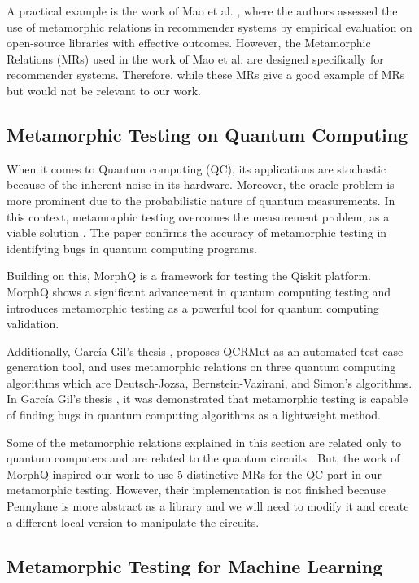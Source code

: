 \documentclass[12pt,a4paper]{article}
\begin{document}
	A practical example is the work of Mao et al. \cite{cmao2024}, where the authors assessed the use of metamorphic relations in recommender systems by empirical evaluation on open-source libraries with effective outcomes. However, the Metamorphic Relations (MRs) used in the work of Mao et al. \cite{cmao2024} are designed specifically for recommender systems. Therefore, while these MRs give a good example of MRs but would not be relevant to our work.
	
	\subsection{Metamorphic Testing on Quantum Computing}
	
	When it comes to Quantum computing (QC), its applications are stochastic because of the inherent noise in its hardware. Moreover, the oracle problem is more prominent due to the probabilistic nature of quantum measurements. In this context, metamorphic testing overcomes the measurement problem, as a viable solution \cite{rabreu2022}. The paper confirms the accuracy of metamorphic testing in identifying bugs in quantum computing programs.  
	
	Building on this, \cite{Paltenghi2023}  MorphQ is a framework for testing the Qiskit platform. MorphQ shows a significant advancement in quantum computing testing and introduces metamorphic testing as a powerful tool for quantum computing validation. 
	
	Additionally, García Gil’s thesis \cite{gracia2024}, proposes QCRMut as an automated test case generation tool, and uses metamorphic relations on three quantum computing algorithms which are Deutsch-Jozsa, Bernstein-Vazirani, and Simon’s algorithms. In García Gil’s thesis \cite{gracia2024}, it was demonstrated that metamorphic testing is capable of finding bugs in quantum computing algorithms as a lightweight method.
	
	Some of the metamorphic relations explained in this section are related only to quantum computers and are related to the quantum circuits  \cite{rabreu2022} \cite{gracia2024}. But, the work of MorphQ  \cite{Paltenghi2023} inspired our work to use 5 distinctive MRs for the QC part in our metamorphic testing. However, their implementation is not finished because Pennylane is more abstract as a library and we will need to modify it and create a different local version to manipulate the circuits.
	
	\subsection{Metamorphic Testing for Machine Learning}
	
\end{document}
